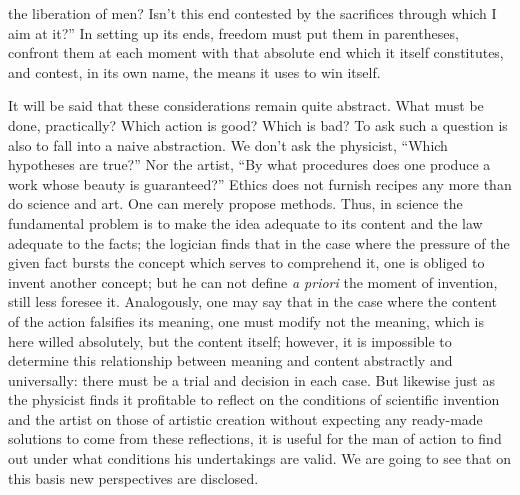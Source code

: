 \documentclass[11pt]{article}
\begin{document}
{{the liberation of men? Isn’t this end contested by the sacrifices through which I aim at it?” In setting up its ends, freedom must put them in parentheses, confront them at each moment with that absolute end which it itself constitutes, and contest, in its own name, the means it uses to win itself.

It will be said that these considerations remain quite abstract. What must be done, practically? Which action is good? Which is bad? To ask such a question is also to fall into a naive abstraction. We don’t ask the physicist, “Which hypotheses are true?” Nor the artist, “By what procedures does one produce a work whose beauty is guaranteed?” Ethics does not furnish recipes any more than do science and art. One can merely propose methods. Thus, in science the fundamental problem is to make the idea adequate to its content and the law adequate to the facts; the logician finds that in the case where the pressure of the given fact bursts the concept which serves to comprehend it, one is obliged to invent another concept; but he can not define \textit{a priori} the moment of invention, still less foresee it. Analogously, one may say that in the case where the content of the action falsifies its meaning, one must modify not the meaning, which is here willed absolutely, but the content itself; however, it is impossible to determine this relationship between meaning and content abstractly and universally: there must be a trial and decision in each case. But likewise just as the physicist finds it profitable to reflect on the conditions of scientific invention and the artist on those of artistic creation without expecting any ready-made solutions to come from these reflections, it is useful for the man of action to find out under what conditions his undertakings are valid. We are going to see that on this basis new perspectives are disclosed.

}}
\end{document}

